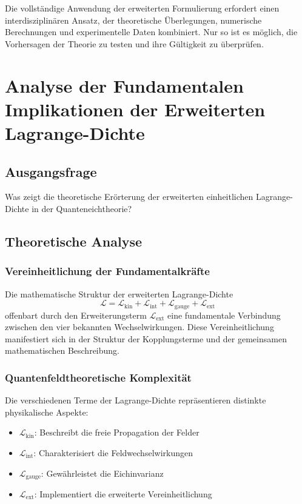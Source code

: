 \documentclass{article}
\begin{document}
Die vollständige Anwendung der erweiterten Formulierung erfordert einen interdisziplinären Ansatz, der theoretische Überlegungen, numerische Berechnungen und experimentelle Daten kombiniert. Nur so ist es möglich, die Vorhersagen der Theorie zu testen und ihre Gültigkeit zu überprüfen.
\section{Analyse der Fundamentalen Implikationen der Erweiterten Lagrange-Dichte}

\subsection{Ausgangsfrage}
Was zeigt die theoretische Erörterung der erweiterten einheitlichen Lagrange-Dichte in der Quanteneichtheorie?

\subsection{Theoretische Analyse}

\subsubsection{Vereinheitlichung der Fundamentalkräfte}
Die mathematische Struktur der erweiterten Lagrange-Dichte
\begin{equation}
	\mathcal{L} = \mathcal{L}_\text{kin} + \mathcal{L}_\text{int} + \mathcal{L}_\text{gauge} + \mathcal{L}_\text{ext}
\end{equation}
offenbart durch den Erweiterungsterm $\mathcal{L}_\text{ext}$ eine fundamentale Verbindung zwischen den vier bekannten Wechselwirkungen. Diese Vereinheitlichung manifestiert sich in der Struktur der Kopplungsterme und der gemeinsamen mathematischen Beschreibung.

\subsubsection{Quantenfeldtheoretische Komplexität}
Die verschiedenen Terme der Lagrange-Dichte repräsentieren distinkte physikalische Aspekte:
\begin{itemize}
	\item $\mathcal{L}_\text{kin}$: Beschreibt die freie Propagation der Felder
	\item $\mathcal{L}_\text{int}$: Charakterisiert die Feldwechselwirkungen
	\item $\mathcal{L}_\text{gauge}$: Gewährleistet die Eichinvarianz
	\item $\mathcal{L}_\text{ext}$: Implementiert die erweiterte Vereinheitlichung
\end{itemize}
\end{document}
